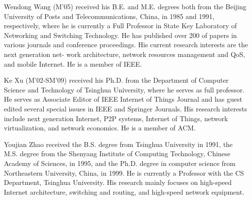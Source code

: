 \documentclass[10pt,journal,compsoc]{IEEEtran}
\begin{document}
\begin{IEEEbiography}
{Wendong Wang} (M'05) received his B.E. and M.E. degrees both from the Beijing University of Posts and Telecommunications, China, in 1985 and 1991, respectively, where he is currently a Full Professor in State Key Laboratory of Networking and Switching Technology. He has published over 200 of papers in various journals and conference proceedings. His current research interests are the next generation net- work architecture, network resources management and QoS, and mobile Internet. He is a member of IEEE.
\end{IEEEbiography}

\begin{IEEEbiography}{Ke Xu} (M'02-SM'09) received his Ph.D. from the Department of Computer Science and Technology of Tsinghua University, where he serves as full professor. He serves as Associate Editor of IEEE Internet of Things Journal and has guest edited several special issues in IEEE and Springer Journals. His research interests include next generation Internet, P2P systems, Internet of Things, network virtualization, and network economics. He is a member of ACM.
\end{IEEEbiography}

\begin{IEEEbiography}
{Youjian Zhao} received the B.S. degree from Tsinghua University in 1991, the M.S. degree from the Shenyang Institute of Computing Technology, Chinese Academy of Sciences, in 1995, and the Ph.D. degree in computer science from Northeastern University, China, in 1999. He is currently a Professor with the CS Department, Tsinghua University. His research mainly focuses on high-speed Internet architecture, switching and routing, and high-speed network equipment.
\end{IEEEbiography}
\end{document}
